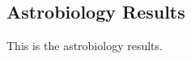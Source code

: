 \subsection{Astrobiology Results}
\label{sec:Astrobiology-Results}

This is the astrobiology results.
